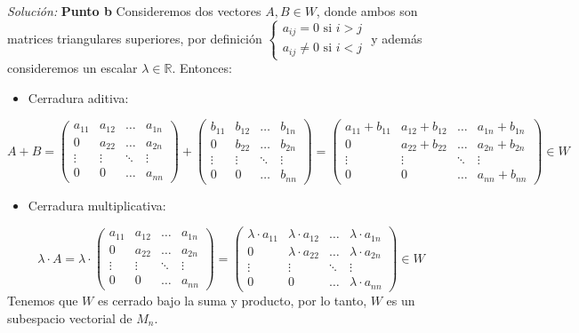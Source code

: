 \documentclass{article}
\newenvironment{solution}
    {\textit{Solución:}}
    {}
\begin{document}
\begin{solution}
\textbf{Punto b}
Consideremos dos vectores $A,B \in W$, donde ambos son matrices triangulares superiores, por definición $\begin{cases} a_{ij}=0 \text{ si } i >j \\ a_{ij}\neq 0 \text{ si } i<j \end{cases}$ y además consideremos un escalar $\lambda \in \mathbb{R}$. Entonces:
\begin{itemize}
\item 
Cerradura aditiva:
\end{itemize}
\[
A+B = 
\begin{pmatrix}
a_{11} & a_{12} & \dots & a_{1n} \\
0 & a_{22} & \dots & a_{2n} \\
\vdots & \vdots & \ddots & \vdots \\
0 & 0 & \dots & a_{nn}
\end{pmatrix} +
\begin{pmatrix}
b_{11} & b_{12} & \dots & b_{1n} \\
0 & b_{22} & \dots & b_{2n} \\
\vdots & \vdots & \ddots & \vdots \\
0 & 0 & \dots & b_{nn}
\end{pmatrix} = 
\begin{pmatrix}
a_{11} +b_{11} & a_{12} + b_{12} & \dots & a_{1n}+ b_{1n} \\
0 & a_{22}+b_{22} & \dots & a_{2n}+b_{2n} \\
\vdots & \vdots & \ddots & \vdots \\
0 & 0 & \dots & a_{nn}+b_{nn} 
\end{pmatrix} \in W
\]\begin{itemize}
\item 
Cerradura multiplicativa:
\end{itemize}
\[
\lambda \cdot A = \lambda \cdot
\begin{pmatrix}
a_{11} & a_{12} & \dots & a_{1n} \\
0 & a_{22} & \dots & a_{2n} \\
\vdots & \vdots & \ddots & \vdots \\
0 & 0 & \dots & a_{nn}
\end{pmatrix} =
\begin{pmatrix}
\lambda \cdot a_{11} & \lambda \cdot a_{12} & \dots & \lambda \cdot a_{1n} \\
0 & \lambda \cdot a_{22} & \dots & \lambda \cdot a_{2n} \\
\vdots & \vdots & \ddots & \vdots \\
0 & 0 & \dots & \lambda \cdot a_{nn}
\end{pmatrix} \in W
\]
Tenemos que $W$ es cerrado bajo la suma y producto, por lo tanto, $W$ es un subespacio vectorial de $M_n$.
\end{solution}
\end{document}
